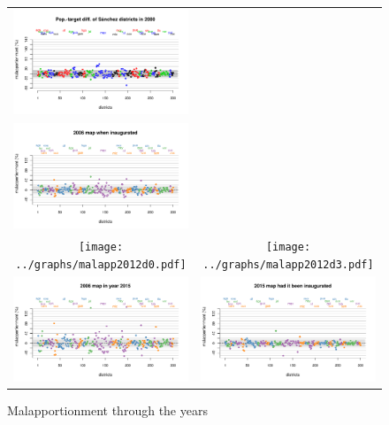 \documentclass[letter,12pt]{article}
\begin{document}
\begin{figure}
\begin{center}
  \begin{tabular}{cc}
    \includegraphics[width=.5\columnwidth]{../graphs/malapp2000d0.pdf} & \\
    \includegraphics[width=.5\columnwidth]{../graphs/malapp2006d0.pdf} & \\
    \texttt{[image: ../graphs/malapp2012d0.pdf]} & \texttt{[image: ../graphs/malapp2012d3.pdf]} \\
    \includegraphics[width=.5\columnwidth]{../graphs/malapp2015d0.pdf} & \includegraphics[width=.5\columnwidth]{../graphs/malapp2015d3.pdf} \\
  \end{tabular}
  \caption{Malapportionment through the years}\label{F:malapp}
\end{center}
\end{figure}
\end{document}
